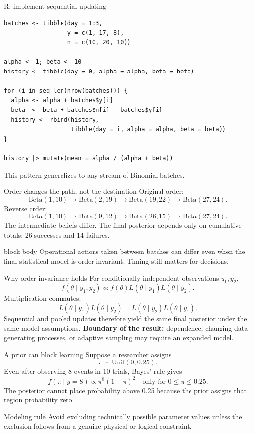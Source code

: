 \documentclass[aspectratio=43,11pt]{beamer}
\newcommand{\riskbox}[1]{\begin{beamercolorbox}[rounded=true,sep=.8em]{block body} #1\end{beamercolorbox}}
\begin{document}
\begin{frame}[fragile]{R: implement sequential updating}
\begin{lstlisting}
batches <- tibble(day = 1:3,
                  y = c(1, 17, 8),
                  n = c(10, 20, 10))

alpha <- 1; beta <- 10
history <- tibble(day = 0, alpha = alpha, beta = beta)

for (i in seq_len(nrow(batches))) {
  alpha <- alpha + batches$y[i]
  beta  <- beta + batches$n[i] - batches$y[i]
  history <- rbind(history,
                   tibble(day = i, alpha = alpha, beta = beta))
}

history |> mutate(mean = alpha / (alpha + beta))
\end{lstlisting}
This pattern generalizes to any stream of Binomial batches.
\end{frame}

\begin{frame}{Order changes the path, not the destination}
Original order:
\[
\mathrm{Beta}(1,10)\to\mathrm{Beta}(2,19)\to
\mathrm{Beta}(19,22)\to\boxed{\mathrm{Beta}(27,24)}.
\]
Reverse order:
\[
\mathrm{Beta}(1,10)\to\mathrm{Beta}(9,12)\to
\mathrm{Beta}(26,15)\to\boxed{\mathrm{Beta}(27,24)}.
\]
The intermediate beliefs differ. The final posterior depends only on cumulative totals: 26 successes and 14 failures.
\riskbox{Operational actions taken between batches can differ even when the final statistical model is order invariant. Timing still matters for decisions.}
\end{frame}

\begin{frame}{Why order invariance holds}
For conditionally independent observations $y_1,y_2$,
\[
f(\theta\mid y_1,y_2)\propto f(\theta)L(\theta\mid y_1)L(\theta\mid y_2).
\]
Multiplication commutes:
\[
L(\theta\mid y_1)L(\theta\mid y_2)
=L(\theta\mid y_2)L(\theta\mid y_1).
\]
Sequential and pooled updates therefore yield the same final posterior under the same model assumptions.
\textbf{Boundary of the result:} dependence, changing data-generating processes, or adaptive sampling may require an expanded model.
\end{frame}

\begin{frame}{A prior can block learning}
Suppose a researcher assigns
\[
\pi\sim\mathrm{Unif}(0,0.25).
\]
Even after observing 8 events in 10 trials, Bayes' rule gives
\[
f(\pi\mid y=8)\propto \pi^8(1-\pi)^2
\quad\text{only for }0\leq\pi\leq0.25.
\]
The posterior cannot place probability above 0.25 because the prior assigns that region probability zero.
\begin{alertblock}{Modeling rule}
Avoid excluding technically possible parameter values unless the exclusion follows from a genuine physical or logical constraint.
\end{alertblock}
\end{frame}
\end{document}
